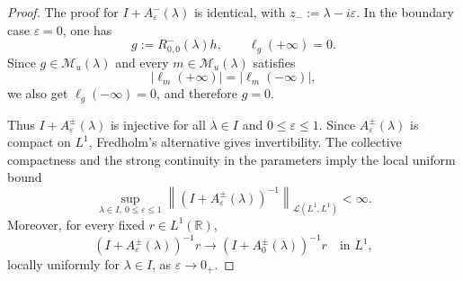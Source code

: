 \documentclass[10pt]{article}
\numberwithin{equation}{section}
\numberwithin{theorem}{section}
\begin{document}
\begin{proof}
The proof for \(I+A_{\varepsilon}^{-}(\lambda)\) is identical, with
\(z_-:=\lambda-i\varepsilon\). In the boundary case \(\varepsilon=0\), one has
\[
g:=R_{0,0}^{-}(\lambda)h,
\qquad
\ell_g(+\infty)=0.
\]
Since \(g\in\mathscr M_u(\lambda)\) and every
\(m\in\mathscr M_u(\lambda)\) satisfies
\[
|\ell_m(+\infty)|=|\ell_m(-\infty)|,
\]
we also get \(\ell_g(-\infty)=0\), and therefore \(g=0\).

Thus \(I+A_{\varepsilon}^{\pm}(\lambda)\) is injective for all
\(\lambda\in I\) and \(0\leq\varepsilon\leq1\). Since
\(A_{\varepsilon}^{\pm}(\lambda)\) is compact on \(L^1\), Fredholm's alternative
gives invertibility. The collective compactness and the strong continuity in the
parameters imply the local uniform bound
\[
\sup_{\lambda\in I,\ 0\leq\varepsilon\leq1}
\left\|
(I+A_{\varepsilon}^{\pm}(\lambda))^{-1}
\right\|_{\mathcal L(L^1,L^1)}
<\infty .
\]
Moreover, for every fixed \(r\in L^1(\mathbb R)\),
\[
(I+A_{\varepsilon}^{\pm}(\lambda))^{-1}r
\longrightarrow
(I+A_0^\pm(\lambda))^{-1}r
\quad\text{in }L^1,
\]
locally uniformly for \(\lambda\in I\), as \(\varepsilon\to0_+\).


\end{proof}
\end{document}
